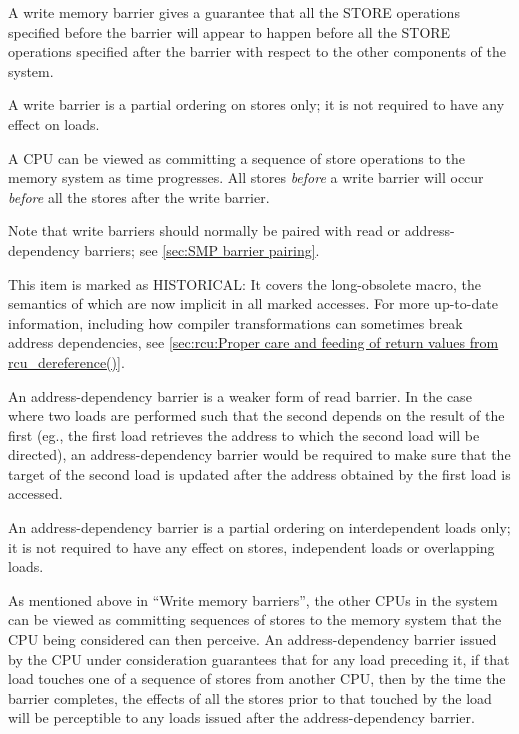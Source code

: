 \begin{description}[style=nextline]
 \item[Write (or store) memory barriers:]
     A write memory barrier gives a guarantee that all the STORE operations
     specified before the barrier will appear to happen before all the STORE
     operations specified after the barrier with respect to the other
     components of the system.

     A write barrier is a partial ordering on stores only; it is not required
     to have any effect on loads.

     A CPU can be viewed as committing a sequence of store operations to the
     memory system as time progresses.
     All stores \emph{before} a write barrier will occur \emph{before} all
     the stores after the write barrier.

     \begin{Note}
     Note that write barriers should normally be paired with read or
     address-dependency barriers; see \cref{sec:SMP barrier pairing}.
     \end{Note}


 \item[Address-dependency barriers (HISTORICAL):]

     \begin{Note}
     This item is marked as HISTORICAL\@:
     It covers the long-obsolete  macro,
     the semantics of which are now implicit in all marked accesses.
     For more up-to-date information, including how compiler transformations
     can sometimes break address dependencies, see
     \cref{sec:rcu:Proper care and feeding of return values from rcu_dereference()}.
     \end{Note}

     An address-dependency barrier is a weaker form of read barrier.
     In the case where two loads are performed such that the second depends
     on the result of the first (eg., the first load retrieves the address
     to which the second load will be directed), an address-dependency
     barrier would be required to make sure that the target of the second
     load is updated after the address obtained by the first load is
     accessed.

     An address-dependency barrier is a partial ordering on interdependent
     loads only; it is not required to have any effect on stores, independent
     loads or overlapping loads.

     As mentioned above in ``Write memory barriers'',
     the other CPUs in the system can be viewed as
     committing sequences of stores to the memory system that the CPU being
     considered can then perceive.
     An address-dependency barrier issued by the CPU under consideration
     guarantees that for any load preceding it, if that load touches one of
     a sequence of stores from another CPU, then by the time the barrier
     completes, the effects of all the stores prior to that touched by the
     load will be perceptible to any loads issued after the
     address-dependency barrier.


\end{description}
